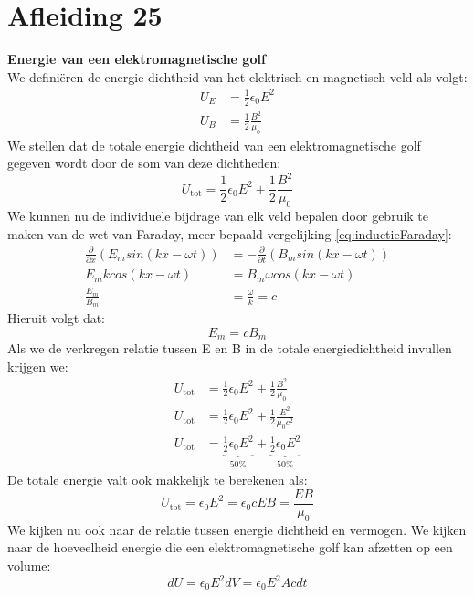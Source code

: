 \documentclass[a4paper,kul]{kulakarticle} %
\begin{document}
\section{Afleiding 25}
\textbf{Energie van een elektromagnetische golf}\\
We definiëren de energie dichtheid van het elektrisch en magnetisch veld als volgt: 
\begin{align*}
	U_E&=\frac{1}{2}\epsilon_0E^2\\
	U_B&=\frac{1}{2}\frac{B^2}{\mu_0}
\end{align*}
We stellen dat de totale energie dichtheid van een elektromagnetische golf gegeven wordt door de som van deze dichtheden:
\begin{equation*}
	U_{\text{tot}} = \frac{1}{2}\epsilon_0E^2+\frac{1}{2}\frac{B^2}{\mu_0}
\end{equation*}
We kunnen nu de individuele bijdrage van elk veld bepalen door gebruik te maken van de wet van Faraday, meer bepaald vergelijking \ref{eq:inductieFaraday}:
\begin{align*}
	\frac{\partial}{\partial x}(E_msin(kx-\omega t)) &=-\frac{\partial}{\partial t}(B_msin(kx-\omega t))\\
	E_mkcos(kx-\omega t) &= B_m\omega cos(kx-\omega t)\\
	\frac{E_m}{B_m} &= \frac{\omega}{k} = c
\end{align*}
Hieruit volgt dat:
\begin{equation*}
	E_m=cB_m
\end{equation*}
Als we de verkregen relatie tussen E en B in de totale energiedichtheid invullen krijgen we:
\begin{align*}
	U_{\text{tot}} &= \frac{1}{2}\epsilon_0E^2+\frac{1}{2}\frac{B^2}{\mu_0}\\
	U_{\text{tot}} &= \frac{1}{2}\epsilon_0E^2+\frac{1}{2}\frac{E^2}{\mu_0c^2}\\
	U_{\text{tot}} &= \underbrace{\frac{1}{2}\epsilon_0E^2}_{\text{50\%}}+\underbrace{\frac{1}{2}\epsilon_0E^2}_{\text{50\%}}
\end{align*}
De totale energie valt ook makkelijk te berekenen als:
\begin{equation*}
	U_{\text{tot}}=\epsilon_0E^2=\epsilon_0cEB = \frac{EB}{\mu_0}
\end{equation*}
We kijken nu ook naar de relatie tussen energie dichtheid en vermogen. We kijken naar de hoeveelheid energie die een elektromagnetische golf kan afzetten op een volume:
\begin{equation*}
	dU = \epsilon_0E^2dV=\epsilon_0E^2Acdt
\end{equation*}
\end{document}
